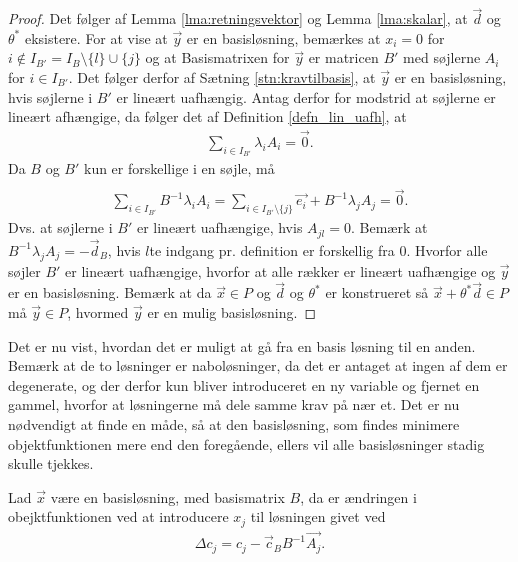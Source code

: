 \begin{proof}
Det følger af Lemma \ref{lma:retningsvektor} og Lemma \ref{lma:skalar}, at $\vec{d}$ og $\theta^*$ eksistere. 
For at vise at $\vec{y}$ er en basisløsning, bemærkes at $x_i = 0$ for $i \notin I_{B'} = I_B\setminus\{l\}\cup\{j\}$ og at Basismatrixen for $\vec{y}$ er matricen $B'$ med søjlerne $A_i$ for $i \in I_{B'}$. 
Det følger derfor af Sætning \ref{stn:kravtilbasis},
at $\vec{y}$ er en basisløsning, hvis søjlerne i $B'$ er lineært uafhængig.
Antag derfor for modstrid at søjlerne er lineært afhængige, da følger det af Definition \ref{defn_lin_uafh},
at
\begin{align*}
 \sum_{i \in I_{B'}} \lambda_i A_i = \vec{0}.
\end{align*}
Da $B$ og $B'$ kun er forskellige i en søjle, må
\begin{align*}
 \\ \sum_{i \in I_{B'}}  B^{-1} \lambda_i A_i  =\sum_{i \in I_{B'}\setminus \{j\}} \vec{e_i} + B^{-1} \lambda_j A_j = \vec{0}.
\end{align*}
Dvs. at søjlerne i $B'$ er lineært uafhængige, hvis $A_{jl} = 0$.
Bemærk at $B^{-1} \lambda_j A_j = - \vec{d}_B$, hvis $l$te indgang pr. definition er forskellig fra $0$. 
Hvorfor alle søjler $B'$ er lineært uafhængige, hvorfor at alle rækker er lineært uafhængige og $\vec{y}$ er en basisløsning.
Bemærk at da $\vec{x}\in P$ og $\vec{d}$ og $\theta^*$ er konstrueret så $\vec{x}+\theta^*\vec{d} \in P$ må $\vec{y} \in P$, hvormed $\vec{y}$ er en mulig basisløsning.
\end{proof}
Det er nu vist, hvordan det er muligt at gå fra en basis løsning til en anden.
 Bemærk at de to løsninger er naboløsninger, da det er antaget at ingen af dem er degenerate, og der derfor kun bliver introduceret en ny variable og fjernet en gammel, hvorfor at løsningerne må dele samme krav på nær et. 
Det er nu nødvendigt at finde en måde, så at den basisløsning, som findes minimere objektfunktionen mere end den foregående, ellers vil alle basisløsninger stadig skulle tjekkes. 
\begin{stn}
Lad $\vec{x}$ være en basisløsning, med basismatrix $B$, da er ændringen i obejktfunktionen ved at introducere $x_j$ til løsningen givet ved
\begin{align*}
 \Delta c_j = c_j-\vec{c}_B B^{-1}\vec{A_j}.
\end{align*}
\label{stn:Deltac}
\end{stn}
